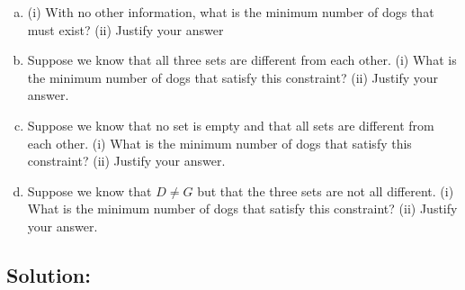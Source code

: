 \documentclass[12pt]{article}
\begin{document}
	\begin{enumerate}[(a)]
		\item (i) With no other information, what is the minimum number of dogs that
			must exist? (ii) Justify your answer

		\item Suppose we know that all three sets are different from each other. (i)
			What is the minimum number of dogs that satisfy this constraint? (ii) Justify
			your answer.

		\item Suppose we know that no set is empty and that all sets are different from
			each other. (i) What is the minimum number of dogs that satisfy this
			constraint? (ii) Justify your answer.

		\item Suppose we know that $D \neq G$ but that the three sets are not all different.
			(i) What is the minimum number of dogs that satisfy this constraint? (ii) Justify
			your answer.
	\end{enumerate}

	\subsection*{\textbf{Solution:}}
\end{document}
